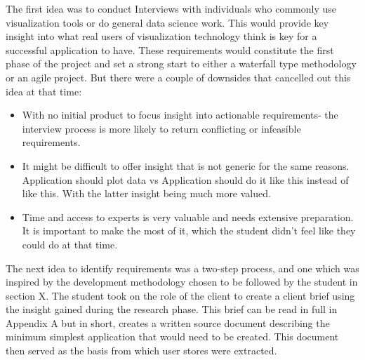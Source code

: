 The first idea was to conduct Interviews with individuals who commonly use visualization tools or do general data science work. This would provide key insight into what real users of visualization technology think is key for a successful application to have. These requirements would constitute the first phase of the project and set a strong start to either a waterfall type methodology or an agile project.
But there were a couple of downsides that cancelled out this idea at that time:
\begin{itemize}
    \item With no initial product to focus insight into actionable requirements- the interview process is more likely to return conflicting or infeasible requirements.
    \item It might be difficult to offer insight that is not generic for the same reasons. Application should plot data vs Application should do it like this instead of like this. With the latter insight being much more valued.
    \item Time and access to experts is very valuable and needs extensive preparation. It is important to make the most of it, which the student didn’t feel like they could do at that time.
\end{itemize}

The next idea to identify requirements was a two-step process, and one which was inspired by the development methodology chosen to be followed by the student in section X. The student took on the role of the client to create a client brief using the insight gained during the research phase. This brief can be read in full in Appendix A but in short, creates a written source document describing the minimum simplest application that would need to be created. This document then served as the basis from which user stores were extracted.